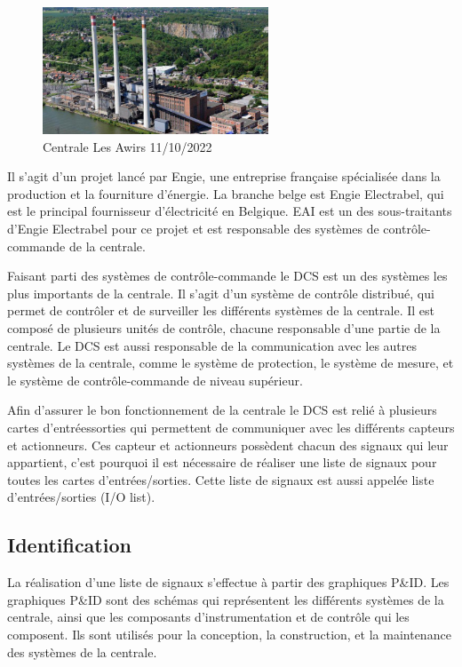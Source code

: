 \documentclass[11pt, openright]{book}
\begin{document}
\begin{figure}[ht!]
    \centering
    \includegraphics[width=0.6\textwidth]{object/g3-1.jpg}
    \caption{Centrale Les Awirs 11/10/2022}
\end{figure}

Il s'agit d'un projet lancé par Engie, une entreprise française spécialisée dans la production et la fourniture d'énergie. La branche belge est Engie Electrabel, qui est le principal fournisseur d'électricité en Belgique. EAI est un des sous-traitants d'Engie Electrabel pour ce projet et est responsable des systèmes de contrôle-commande de la centrale.


Faisant parti des systèmes de contrôle-commande le DCS est un des systèmes les plus importants de la centrale. Il s'agit d'un système de contrôle distribué, qui permet de contrôler et de surveiller les différents systèmes de la centrale. Il est composé de plusieurs unités de contrôle, chacune responsable d'une partie de la centrale. Le DCS est aussi responsable de la communication avec les autres systèmes de la centrale, comme le système de protection, le système de mesure, et le système de contrôle-commande de niveau supérieur.

Afin d'assurer le bon fonctionnement de la centrale le DCS est relié à plusieurs cartes d'entrées\-sorties qui permettent de communiquer avec les différents capteurs et actionneurs. Ces capteur et actionneurs possèdent chacun des signaux qui leur appartient, c'est pourquoi il est nécessaire de réaliser une liste de signaux pour toutes les cartes d'entrées/sorties. Cette liste de signaux est aussi appelée liste d'entrées/sorties (I/O list).


\subsection{Identification}

La réalisation d'une liste de signaux s'effectue à partir des graphiques P\&ID. Les graphiques P\&ID sont des schémas qui représentent les différents systèmes de la centrale, ainsi que les composants d'instrumentation et de contrôle qui les composent. Ils sont utilisés pour la conception, la construction, et la maintenance des systèmes de la centrale.
\end{document}
